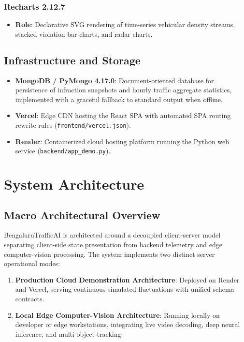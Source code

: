 \documentclass[11pt,a4paper,oneside]{report}
\begin{document}
\subsection{Recharts 2.12.7}
\begin{itemize}[leftmargin=*]
    \item \textbf{Role}: Declarative SVG rendering of time-series vehicular density streams, stacked violation bar charts, and radar charts.
\end{itemize}

\section{Infrastructure and Storage}
\begin{itemize}[leftmargin=*]
    \item \textbf{MongoDB / PyMongo 4.17.0}: Document-oriented database for persistence of infraction snapshots and hourly traffic aggregate statistics, implemented with a graceful fallback to standard output when offline.
    \item \textbf{Vercel}: Edge CDN hosting the React SPA with automated SPA routing rewrite rules (\texttt{frontend/vercel.json}).
    \item \textbf{Render}: Containerized cloud hosting platform running the Python web service (\texttt{backend/app\_demo.py}).
\end{itemize}



\chapter{System Architecture}

\section{Macro Architectural Overview}
BengaluruTrafficAI is architected around a decoupled client-server model separating client-side state presentation from backend telemetry and edge computer-vision processing. The system implements two distinct server operational modes:
\begin{enumerate}
    \item \textbf{Production Cloud Demonstration Architecture}: Deployed on Render and Vercel, serving continuous simulated fluctuations with unified schema contracts.
    \item \textbf{Local Edge Computer-Vision Architecture}: Running locally on developer or edge workstations, integrating live video decoding, deep neural inference, and multi-object tracking.
\end{enumerate}
\end{document}
